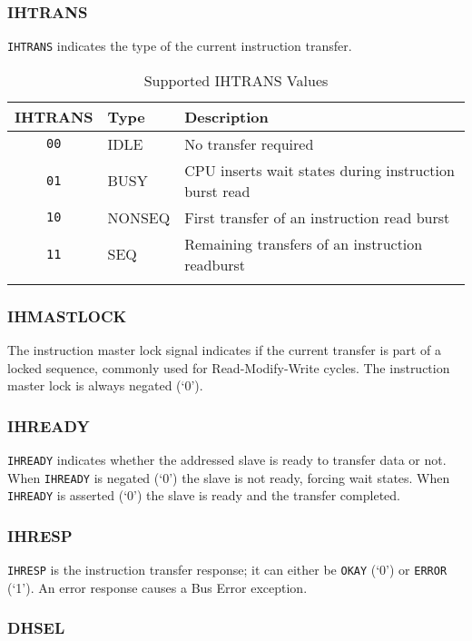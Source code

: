 \subsubsection{IHTRANS}\label{ihtrans}

\texttt{IHTRANS} indicates the type of the current instruction transfer.

\begin{longtable}[]{@{}cll@{}}
\toprule
IHTRANS & Type & Description\tabularnewline
\midrule
\endhead
\texttt{00} & IDLE & No transfer required\tabularnewline
\texttt{01} & BUSY & CPU inserts wait states during instruction burst read\tabularnewline
\texttt{10} & NONSEQ & First transfer of an instruction read burst\tabularnewline
\texttt{11} & SEQ & Remaining transfers of an instruction readburst\tabularnewline
\bottomrule
\caption{Supported IHTRANS Values}
\label{tab:ihtrans-values}
\end{longtable}

\subsubsection{IHMASTLOCK}\label{ihmastlock}

The instruction master lock signal indicates if the current transfer is
part of a locked sequence, commonly used for Read-Modify-Write cycles.
The instruction master lock is always negated (`0').

\subsubsection{IHREADY}\label{ihready}

\texttt{IHREADY} indicates whether the addressed slave is ready to transfer data
or not. When \texttt{IHREADY} is negated (`0') the slave is not ready, forcing
wait states. When \texttt{IHREADY} is asserted (`0') the slave is ready and the
transfer completed.

\subsubsection{IHRESP}\label{ihresp}

\texttt{IHRESP} is the instruction transfer response; it can either be \texttt{OKAY} (`0')
or \texttt{ERROR} (`1'). An error response causes a Bus Error exception.

\subsubsection{DHSEL}\label{dhsel}

